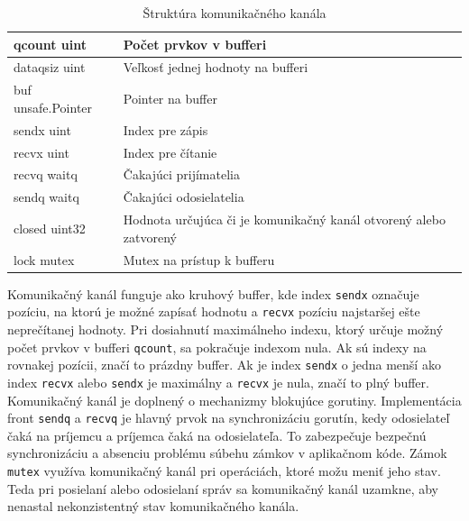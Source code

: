\documentclass[
  biblatex,
  seconds=true,
  language=slovak,
  figures=false,
  urldate=iso,
  glossaries,
  index
]{kidiplom}
\begin{document}
\begin{table}[H]
	\caption{Štruktúra komunikačného kanála \cite{goChan}}
	\begin{tabular}{|l|p{8cm}|}
		\hline
		qcount uint        & Počet prvkov v bufferi                                            \\
		\hline
		dataqsiz uint      & Veľkosť jednej hodnoty na bufferi                                 \\
		\hline
		buf unsafe.Pointer & Pointer na buffer                                                 \\
		\hline
		sendx uint         & Index pre zápis                                                   \\
		\hline
		recvx uint         & Index pre čítanie                                                 \\
		\hline
		recvq waitq        & Čakajúci prijímatelia                                             \\
		\hline
		sendq waitq        & Čakajúci odosielatelia                                            \\
		\hline
		closed uint32      & Hodnota určujúca či je komunikačný kanál otvorený alebo zatvorený \\
		\hline
		lock mutex         & Mutex na prístup k bufferu                                        \\
		\hline
	\end{tabular}
\end{table}
Komunikačný kanál funguje ako kruhový buffer, kde index \texttt{sendx} označuje pozíciu, na ktorú je možné zapísať hodnotu a \texttt{recvx} pozíciu najstaršej ešte neprečítanej hodnoty.
Pri dosiahnutí maximálneho indexu, ktorý určuje možný počet prvkov v bufferi \texttt{qcount},
sa pokračuje indexom nula. Ak sú indexy na rovnakej pozícii,
značí to prázdny buffer. Ak je index \texttt{sendx} o jedna menší ako index \texttt{recvx} alebo \texttt{sendx} je maximálny a \texttt{recvx} je nula, značí to plný buffer.
Komunikačný kanál je doplnený o mechanizmy blokujúce gorutiny.\cite{goChan}
Implementácia front \texttt{sendq} a \texttt{recvq} je hlavný prvok na synchronizáciu gorutín, kedy odosielateľ čaká na príjemcu
a príjemca čaká na odosielateľa. To zabezpečuje bezpečnú synchronizáciu a absenciu problému súbehu zámkov v aplikačnom kóde.
Zámok \texttt{mutex} využíva komunikačný kanál pri operáciách, ktoré možu meniť jeho stav. Teda pri posielaní alebo odosielaní správ
sa komunikačný kanál uzamkne, aby nenastal nekonzistentný stav komunikačného kanála.
\end{document}
